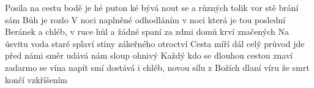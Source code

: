 \begin{TEXT}{Posila na cestu}
\SLOKA {}bodě je hé puton  \NL
{}ké bývá nout se a   \NL
{} různých  tolik vor stě brání \NL
{} sám Bůh je  rozlo   
\SLOKA V noci naplněné odhodláním \NL
v noci která je tou poslední \NL
Beránek a chléb, v ruce hůl a žádné spaní \NL
za zdmi domů krví značených 
\SLOKA Na úsvitu voda staré splaví \NL
stíny zákeřného otroctví \NL
Cesta míří dál celý průvod jde před námi \NL
směr udává nám sloup ohnivý 
\SLOKA Každý kdo se dlouhou cestou znaví \NL
zadarmo se vína napít smí \NL
dostává i chléb, novou sílu z Božích dlaní \NL
víru že smrt končí vzkříšením \NL
\end{TEXT}
